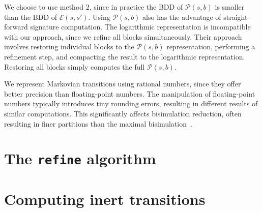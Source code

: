We choose to use method 2, since in practice the BDD of $\mathcal{P}(s,b)$ is smaller than the BDD of $\mathcal{E}(s,s')$.
Using $\mathcal{P}(s,b)$ also has the advantage of straight-forward signature computation.
%
%
The logarithmic representation is incompatible with our approach, since we refine all blocks simultaneously. Their approach involves restoring individual blocks to the $\mathcal{P}(s,b)$ representation, performing a refinement step, and compacting the result to the logarithmic representation. Restoring all blocks simply computes the full $\mathcal{P}(s,b)$.

We represent Markovian transitions using rational numbers, since they offer better precision than floating-point numbers.
The manipulation of floating-point numbers typically introduces tiny rounding errors, resulting in different results of similar computations.
This significantly affects bisimulation reduction, often resulting in finer partitions than the maximal bisimulation~\cite{DBLP:conf/mmb/WimmerB10}.


\section{The \texttt{refine} algorithm}
\label{sec:refine}


\section{Computing inert transitions}
\label{sec:inert}

